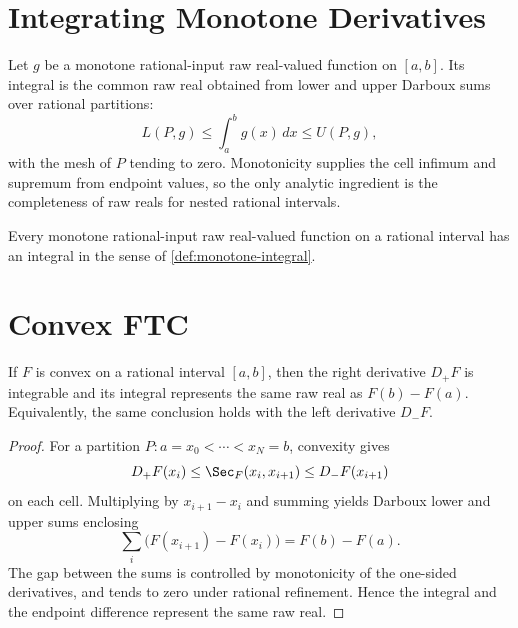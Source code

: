 \section{Integrating Monotone Derivatives}

\begin{definition}
\label{def:monotone-integral}
Let \(g\) be a monotone rational-input raw real-valued function on
\([a,b]\).  Its integral is the common raw real obtained from lower and upper
Darboux sums over rational partitions:
\[
  L(P,g)\le \int_a^b g(x)\,dx \le U(P,g),
\]
with the mesh of \(P\) tending to zero.  Monotonicity supplies the cell
infimum and supremum from endpoint values, so the only analytic ingredient is
the completeness of raw reals for nested rational intervals.
\end{definition}

\begin{theorem}
\label{thm:monotone-integrable}
Every monotone rational-input raw real-valued function on a rational interval
has an integral in the sense of \cref{def:monotone-integral}.
\end{theorem}

\section{Convex FTC}

\begin{theorem}\label{thm:convex-ftc}
If \(F\) is convex on a rational interval \([a,b]\), then the right
derivative \(D_+F\) is integrable and its integral represents the same raw
real as \(F(b)-F(a)\).
Equivalently, the same conclusion holds with the left derivative \(D_-F\).
\end{theorem}

\begin{proof}
For a partition \(P:a=x_0<\cdots<x_N=b\), convexity gives
\[
  D_+F(x_i)
  \le
  \Sec_F(x_i,x_{i+1})
  \le
  D_-F(x_{i+1})
\]
on each cell.  Multiplying by \(x_{i+1}-x_i\) and summing yields Darboux
lower and upper sums enclosing
\[
  \sum_i \bigl(F(x_{i+1})-F(x_i)\bigr)=F(b)-F(a).
\]
The gap between the sums is controlled by monotonicity of the one-sided
derivatives, and tends to zero under rational refinement.  Hence the integral
and the endpoint difference represent the same raw real.
\end{proof}

